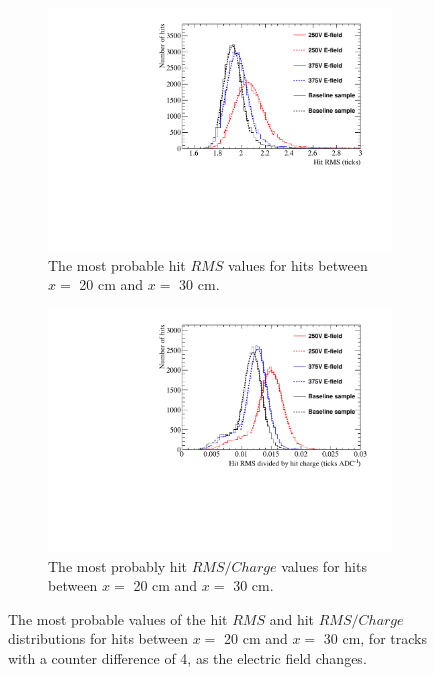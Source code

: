 \begin{figure}[h!]
  \centering
  \begin{subfigure}{0.45\textwidth}
    \centering
    \includegraphics[width=\textwidth]{Canvas_RMS_20cm_ElecField}
    \caption{The most probable hit $RMS$ values for hits between $x =$ 20 cm and $x =$ 30 cm.}
  \end{subfigure}
  \hspace{0.08\textwidth}
  \begin{subfigure}{0.45\textwidth}
    \centering
    \includegraphics[width=\textwidth]{Canvas_RMS_Q_20cm_ElecField}
    \caption{The most probably hit $RMS/Charge$ values for hits between $x =$ 20 cm and $x =$ 30 cm.}
  \end{subfigure}
  \caption[The most probable values of the hit $RMS$ and hit $RMS/Charge$ distributions for tracks with a counter difference of 4, as the electric field changes]
          {The most probable values of the hit $RMS$ and hit $RMS/Charge$ distributions for hits between $x =$ 20 cm and $x =$ 30 cm, for tracks with a counter difference of 4, as the electric field changes.}
  \label{fig:DiffElecStudy_HitFit}
\end{figure}


